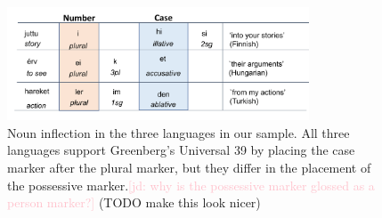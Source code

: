 \documentclass[11pt,letterpaper]{article}
\newcommand\mhahn[1]{{\color{red}(#1)}}
\newcommand{\jd}[1]{\textcolor{Pink}{[jd: #1]}}
\begin{document}


\begin{figure}
\includegraphics[width=0.8\textwidth]{figures/noun-morphemes.pdf}


\caption{Noun inflection in the three languages in our sample. All three languages support Greenberg's Universal 39 by placing the case marker after the plural marker, but they differ in the placement of the possessive marker.\jd{why is the possessive marker glossed as a person marker?} \mhahn{TODO make this look nicer}}\label{fig:noun-inflection}
\end{figure}
\end{document}

